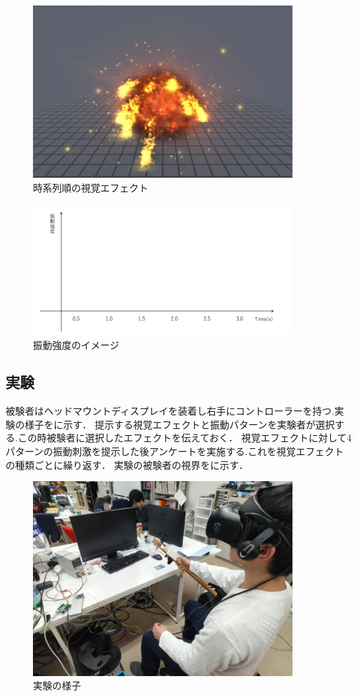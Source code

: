 \begin{figure}[h]
\centering
\includegraphics[clip,width=10cm]{./fig/explosion.png}
\caption{時系列順の視覚エフェクト}\label{expTime}
\end{figure}

\begin{figure}[h]
\centering
\includegraphics[clip,width=10cm]{./fig/ank.png}
\caption{振動強度のイメージ}\label{ank}
\end{figure}

\newpage

\subsection{実験}
被験者はヘッドマウントディスプレイを装着し右手にコントローラーを持つ.実験の様子をに示す．
提示する視覚エフェクトと振動パターンを実験者が選択する.この時被験者に選択したエフェクトを伝えておく．
視覚エフェクトに対して4パターンの振動刺激を提示した後アンケートを実施する.これを視覚エフェクトの種類ごとに繰り返す．
実験の被験者の視界をに示す．

\begin{figure}[h]
\centering
\includegraphics[clip,width=10cm]{./fig/jikken.JPG}
\caption{実験の様子}\label{jikken}
\end{figure}


